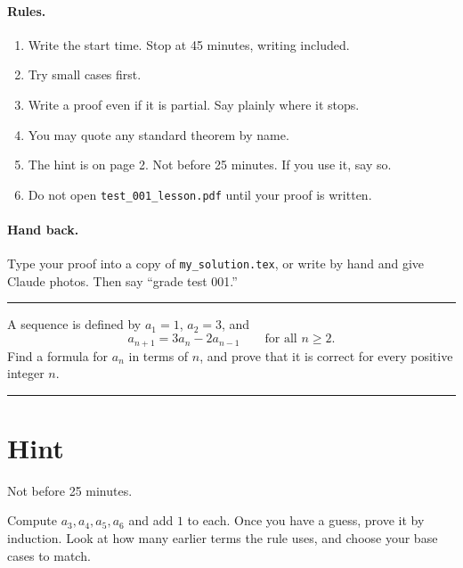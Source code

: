\documentclass[11pt]{article}
\begin{document}

\paragraph{Rules.}
\begin{enumerate}
  \item Write the start time. Stop at 45 minutes, writing included.
  \item Try small cases first.
  \item Write a proof even if it is partial. Say plainly where it stops.
  \item You may quote any standard theorem by name.
  \item The hint is on page 2. Not before 25 minutes. If you use it, say so.
  \item Do not open \texttt{test\_001\_lesson.pdf} until your proof is written.
\end{enumerate}

\paragraph{Hand back.} Type your proof into a copy of \texttt{my\_solution.tex}, or write by hand and give Claude photos. Then say ``grade test 001.''

\vspace{10pt}\hrule\vspace{10pt}

\begin{problem}
A sequence is defined by $a_1 = 1$, $a_2 = 3$, and
\[ a_{n+1} = 3a_n - 2a_{n-1} \qquad \text{for all } n \ge 2. \]
Find a formula for $a_n$ in terms of $n$, and prove that it is correct for every positive integer $n$.
\end{problem}

\vspace{10pt}\hrule

\clearpage
\section*{Hint}
Not before 25 minutes.

\spoilerspace
\begin{hint}
Compute $a_3, a_4, a_5, a_6$ and add $1$ to each. Once you have a guess, prove it by induction. Look at how many earlier terms the rule uses, and choose your base cases to match.
\end{hint}
\end{document}
